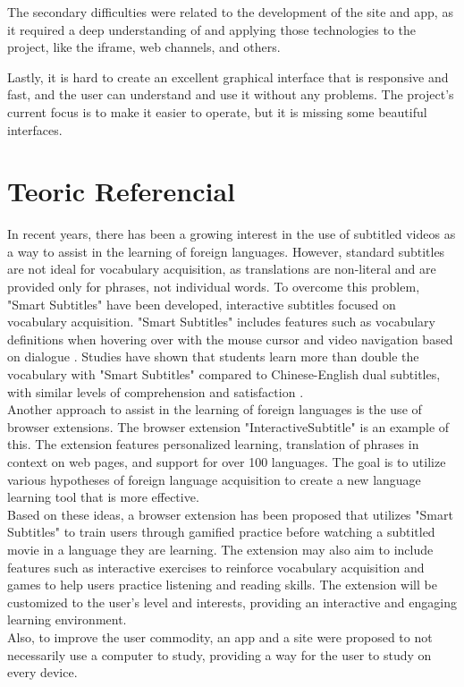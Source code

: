 \documentclass[12pt]{article}
\begin{document}
The secondary difficulties were related to the development of the site and app, as it required a deep understanding of and applying those technologies to the project, like the iframe, web channels, and others.

Lastly, it is hard to create an excellent graphical interface that is responsive and fast, and the user can understand and use it without any problems. The project's current focus is to make it easier to operate, but it is missing some beautiful interfaces. 

\section{Teoric Referencial}
In recent years, there has been a growing interest in the use of subtitled videos as a way to assist in the learning of foreign languages. However, standard subtitles are not ideal for vocabulary acquisition, as translations are non-literal and are provided only for phrases, not individual words. To overcome this problem, "Smart Subtitles" have been developed, interactive subtitles focused on vocabulary acquisition. "Smart Subtitles" includes features such as vocabulary definitions when hovering over with the mouse cursor and video navigation based on dialogue \cite{Kovacs13}. Studies have shown that students learn more than double the vocabulary with "Smart Subtitles" compared to Chinese-English dual subtitles, with similar levels of comprehension and satisfaction \cite{Kovacs14}. \\ 
Another approach to assist in the learning of foreign languages is the use of browser extensions. The browser extension "InteractiveSubtitle" \cite{ElBatanony21} is an example of this. The extension features personalized learning, translation of phrases in context on web pages, and support for over 100 languages. The goal is to utilize various hypotheses of foreign language acquisition to create a new language learning tool that is more effective. \\ 
Based on these ideas, a browser extension has been proposed that utilizes "Smart Subtitles" to train users through gamified practice before watching a subtitled movie in a language they are learning. The extension may also aim to include features such as interactive exercises to reinforce vocabulary acquisition and games to help users practice listening and reading skills. The extension will be customized to the user's level and interests, providing an interactive and engaging learning environment. \\
Also, to improve the user commodity, an app and a site were proposed to not necessarily use a computer to study, providing a way for the user to study on every device.
\end{document}
